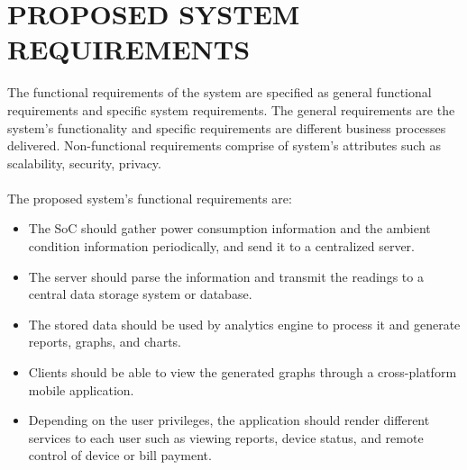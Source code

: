 \documentclass[a4paper,12pt,oneside]{article}
\begin{document}
\newpage
\section{PROPOSED SYSTEM REQUIREMENTS}
The functional requirements of the system are specified as
general functional requirements and specific system
requirements. The general requirements are the system’s
functionality and specific requirements are different business
processes delivered. Non-functional requirements comprise of
system’s attributes such as scalability, security, privacy.
\paragraph{}
The proposed system’s functional requirements are:
\begin{itemize}
    \item The SoC should gather power consumption information
    and the ambient condition information periodically, and
    send it to a centralized server.
    \item The server should parse the information and transmit
    the readings to a central data storage system or
    database.
    \item The stored data should be used by analytics engine to
    process it and generate reports, graphs, and charts.
    \item Clients should be able to view the generated graphs
    through a cross-platform mobile application.
    \item Depending on the user privileges, the application
    should render different services to each user such as
    viewing reports, device status, and remote control of
    device or bill payment.
\end{itemize}
\newpage
\end{document}

